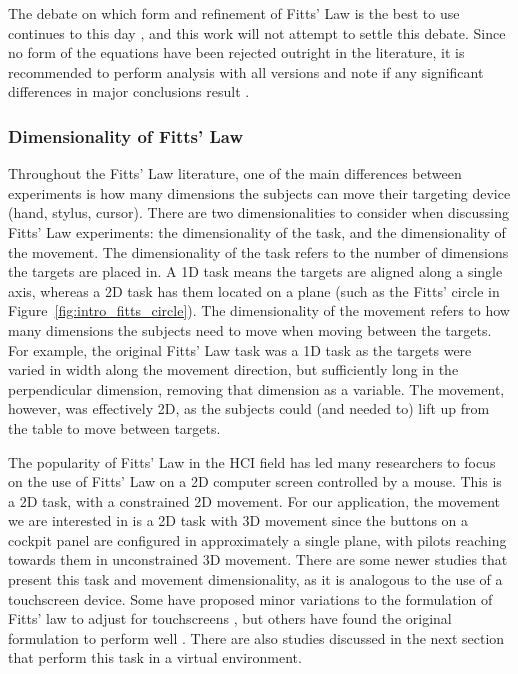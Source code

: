 The debate on which form and refinement of Fitts' Law is the best to use continues to this day \citep{drewes_only_2010,hoffmann_which_2013}, and this work will not attempt to settle this debate.
Since no form of the equations have been rejected outright in the literature, it is recommended to perform analysis with all versions and note if any significant differences in major conclusions result \citep{soukoreff_towards_2004}.

\subsubsection{Dimensionality of Fitts' Law}\label{dimensionality-of-fitts-law}

Throughout the Fitts' Law literature, one of the main differences between experiments is how many dimensions the subjects can move their targeting device (hand, stylus, cursor).
There are two dimensionalities to consider when discussing Fitts' Law experiments: the dimensionality of the task, and the dimensionality of the movement.
The dimensionality of the task refers to the number of dimensions the targets are placed in.
A 1D task means the targets are aligned along a single axis, whereas a 2D task has them located on a plane (such as the Fitts' circle in Figure~\ref{fig:intro_fitts_circle}).
The dimensionality of the movement refers to how many dimensions the subjects need to move when moving between the targets.
For example, the original Fitts' Law task was a 1D task as the targets were varied in width along the movement direction, but sufficiently long in the perpendicular dimension, removing that dimension as a variable.
The movement, however, was effectively 2D, as the subjects could (and needed to) lift up from the table to move between targets.

The popularity of Fitts' Law in the HCI field has led many researchers to focus on the use of Fitts' Law on a 2D computer screen controlled by a mouse.
This is a 2D task, with a constrained 2D movement.
For our application, the movement we are interested in is a 2D task with 3D movement since the buttons on a cockpit panel are configured in approximately a single plane, with pilots reaching towards them in unconstrained 3D movement.
There are some newer studies that present this task and movement dimensionality, as it is analogous to the use of a touchscreen device.
Some have proposed minor variations to the formulation of Fitts' law to adjust for touchscreens \citep{bi_ffitts_2013,sears_high_1991}, but others have found the original formulation to perform well \citep{mackenzie_fitts_2015}.
There are also studies discussed in the next section that perform this task in a virtual environment.

